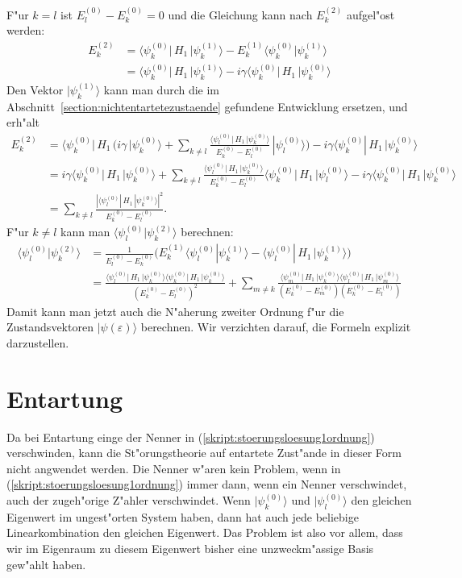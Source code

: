 F"ur $k=l$ ist $E_l^{(0)}-E_k^{(0)}=0$ und die Gleichung kann nach 
$E_k^{(2)}$ aufgel"ost werden:
\begin{align*}
E_k^{(2)}
&=
\langle\psi_k^{(0)}|\, H_1\, |\psi_k^{(1)}\rangle
-E_k^{(1)}\langle\psi_k^{(0)}|\psi_k^{(1)}\rangle
\\
&=
\langle\psi_k^{(0)}|\, H_1\, |\psi_k^{(1)}\rangle
-i\gamma
\langle \psi_k^{(0)}|\, H_1 \,|\psi_k^{(0)}\rangle
\end{align*}
Den Vektor $|\psi_k^{(1)}\rangle$ kann man durch die im
Abschnitt~\ref{section:nichtentartetezustaende} gefundene
Entwicklung ersetzen, und erh"alt
\begin{align*}
E_k^{(2)}
&=
\langle\psi_k^{(0)}|\, H_1\,
\biggl(
i\gamma
\,|\psi_k^{(0)}\rangle
+
\sum_{k\ne l}
\frac{\langle \psi_l^{(0)}|\, H_1 \,|\psi_k^{(0)}\rangle}{E_k^{(0)}-E_l^{(0)}}
\,
|\psi_l^{(0)}\rangle
\biggr)
-i\gamma
\langle \psi_k^{(0)}|\, H_1 \,|\psi_k^{(0)}\rangle
\\
&=
i\gamma\langle\psi_k^{(0)}|\, H_1\, |\psi_k^{(0)}\rangle
+
\sum_{k\ne l}
\frac{\langle \psi_l^{(0)}|\, H_1 \,|\psi_k^{(0)}\rangle}{E_k^{(0)}-E_l^{(0)}}
\langle\psi_k^{(0)}|\, H_1 \,|\psi_l^{(0)}\rangle
-i\gamma
\langle \psi_k^{(0)}|\, H_1 \,|\psi_k^{(0)}\rangle
\\
&=
\sum_{k\ne l}
\frac{|\langle \psi_l^{(0)}|\, H_1 \,|\psi_k^{(0)}\rangle|^2}{E_k^{(0)}-E_l^{(0)}}.
\end{align*}
F"ur $k\ne l$ kann man $\langle\psi_l^{(0)}|\psi_k^{(2)}\rangle$ 
berechnen:
\begin{align*}
\langle\psi_l^{(0)}|\psi_k^{(2)}\rangle
&=
\frac1{E_l^{(0)}-E_k^{(0)}}\biggl(
E_k^{(1)}\langle\psi_l^{(0)}|\psi_k^{(1)}\rangle
-
\langle\psi_l^{(0)}|\,H_1\,|\psi_k^{(1)}\rangle
\biggr)
\\
&=
\frac{
\langle \psi_l^{(0)}|\, H_1 \,|\psi_k^{(0)}\rangle
\langle \psi_k^{(0)}|\, H_1 \,|\psi_k^{(0)}\rangle
}{
(E_k^{(0)}-E_l^{(0)})^2
}
+
\sum_{m\ne k}
\frac{\langle \psi_m^{(0)}|\, H_1 \,|\psi_k^{(0)}\rangle
\langle\psi_l^{(0)}|\, H_1 \,|\psi_m^{(0)}\rangle
}{
(E_k^{(0)}-E_m^{(0)})
(E_k^{(0)}-E_l^{(0)})
}
\end{align*}
Damit kann man jetzt auch die N"aherung zweiter Ordnung
f"ur die Zustandsvektoren $|\psi(\varepsilon)\rangle$
berechnen.
Wir verzichten darauf, die Formeln explizit darzustellen.

\section{Entartung}
Da bei Entartung einge der Nenner in (\ref{skript:stoerungsloesung1ordnung})
verschwinden, kann die St"orungstheorie auf entartete Zust"ande
in dieser Form nicht angwendet werden.
Die Nenner w"aren kein Problem, wenn in (\ref{skript:stoerungsloesung1ordnung})
immer dann, wenn ein Nenner verschwindet, auch der zugeh"orige Z"ahler
verschwindet.
Wenn $|\psi_k^{(0)}\rangle$ und $|\psi_l^{(0)}\rangle$ den gleichen
Eigenwert im ungest"orten System haben, dann hat auch jede beliebige
Linearkombination den gleichen Eigenwert.
Das Problem ist also vor allem, dass wir im Eigenraum zu diesem
Eigenwert bisher eine unzweckm"assige Basis gew"ahlt haben.


